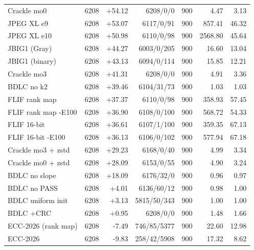 \begin{table}[t]
\begin{tabular}{lrrrrrr}
Crackle mo0 & 6208 & +54.12 & 6208/0/0 & 900 & 4.47 & 3.13 \\
JPEG XL e9 & 6208 & +53.07 & 6117/0/91 & 900 & 857.41 & 46.32 \\
JPEG XL e10 & 6208 & +50.98 & 6110/0/98 & 900 & 2568.80 & 45.64 \\
JBIG1 (Gray) & 6208 & +44.27 & 6003/0/205 & 900 & 16.60 & 13.04 \\
JBIG1 (binary) & 6208 & +43.13 & 6094/0/114 & 900 & 15.85 & 12.21 \\
Crackle mo3 & 6208 & +41.31 & 6208/0/0 & 900 & 4.91 & 3.36 \\
BDLC no k2 & 6208 & +39.46 & 6104/31/73 & 900 & 1.03 & 1.03 \\
FLIF rank map & 6208 & +37.37 & 6110/0/98 & 900 & 358.93 & 57.45 \\
FLIF rank map -E100 & 6208 & +36.90 & 6108/0/100 & 900 & 568.72 & 54.33 \\
FLIF 16-bit & 6208 & +36.61 & 6107/1/100 & 900 & 359.35 & 67.13 \\
FLIF 16-bit -E100 & 6208 & +36.13 & 6106/0/102 & 900 & 577.94 & 67.18 \\
Crackle mo3 + zstd & 6208 & +29.23 & 6168/0/40 & 900 & 4.99 & 3.34 \\
Crackle mo0 + zstd & 6208 & +28.09 & 6153/0/55 & 900 & 4.90 & 3.24 \\
BDLC no slope & 6208 & +18.09 & 6176/32/0 & 900 & 0.96 & 0.97 \\
BDLC no PASS & 6208 & +4.01 & 6136/60/12 & 900 & 0.98 & 1.00 \\
BDLC uniform init & 6208 & +3.13 & 5815/50/343 & 900 & 1.00 & 1.00 \\
BDLC +CRC & 6208 & +0.95 & 6208/0/0 & 900 & 1.48 & 1.66 \\
ECC-2026 (rank map) & 6208 & -7.49 & 746/85/5377 & 900 & 22.60 & 12.98 \\
ECC-2026 & 6208 & -9.83 & 258/42/5908 & 900 & 17.32 & 8.62 \\
\hline
\end{tabular}
\end{table}
